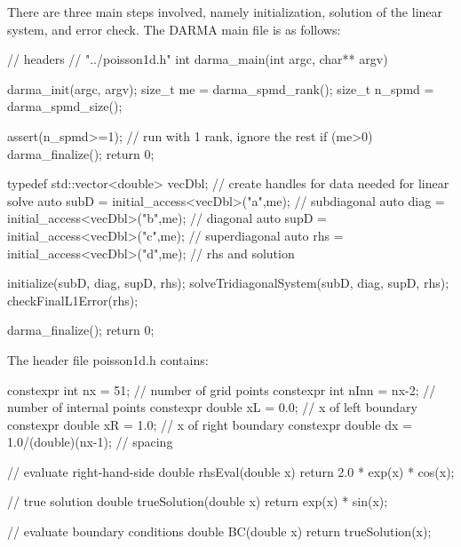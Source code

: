 There are three main steps involved, namely initialization, 
solution of the linear system, and error check. 
The DARMA main file is as follows:
\begin{CppCodeNumb}
// headers
// "../poisson1d.h"
int darma_main(int argc, char** argv)
{
  darma_init(argc, argv);
  size_t me = darma_spmd_rank();
  size_t n_spmd = darma_spmd_size();

  assert(n_spmd>=1);   // run with 1 rank, ignore the rest
  if (me>0){
    darma_finalize();
    return 0;
  }

  typedef std::vector<double> vecDbl;
  // create handles for data needed for linear solve
  auto subD = initial_access<vecDbl>("a",me); // subdiagonal 
  auto diag = initial_access<vecDbl>("b",me); // diagonal 
  auto supD = initial_access<vecDbl>("c",me); // superdiagonal
  auto rhs  = initial_access<vecDbl>("d",me); // rhs and solution

  initialize(subD, diag, supD, rhs);
  solveTridiagonalSystem(subD, diag, supD, rhs);
  checkFinalL1Error(rhs);

  darma_finalize();
  return 0;
}
\end{CppCodeNumb}

The header file poisson1d.h contains:
\begin{CppCodeNumb}
constexpr int nx = 51;                      // number of grid points
constexpr int nInn = nx-2;                  // number of internal points
constexpr double xL = 0.0;                  // x of left boundary
constexpr double xR = 1.0;                  // x of right boundary
constexpr double dx = 1.0/(double)(nx-1);   // spacing

// evaluate right-hand-side
double rhsEval(double x){ 
  return 2.0 * exp(x) * cos(x);
}

// true solution
double trueSolution(double x){
  return exp(x) * sin(x);
}

// evaluate boundary conditions
double BC(double x){
  return trueSolution(x);
}
\end{CppCodeNumb}


